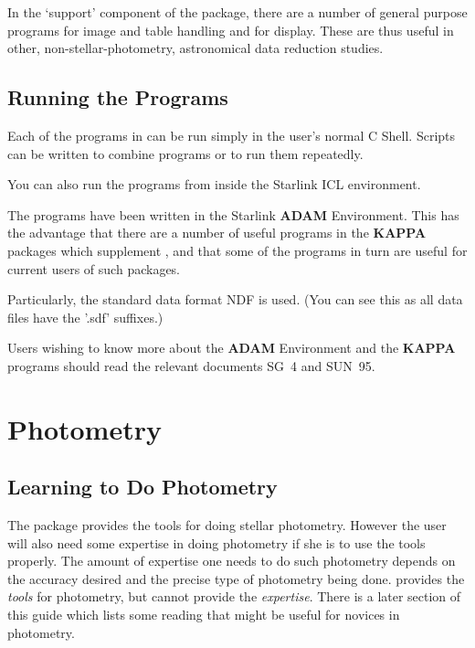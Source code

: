 In the `support' component of the \starman package, there are a number of
general purpose programs for image and table handling and for display.
These are thus useful in other, non-stellar-photometry, astronomical data
reduction studies.

\subsection{Running the Programs }

Each of the programs in \starman can be run simply in the user's
normal C Shell. Scripts can be written to combine programs or to
run them repeatedly.

You can also run the programs from inside the Starlink ICL environment.

The programs have been written in the Starlink {\bf ADAM} Environment. This
has the advantage that there are a number of useful programs in the {\bf
KAPPA} packages which supplement \starman, and that some of the \starman
programs in turn are useful for current users of such packages.

Particularly, the standard data format NDF is used. (You can see
this as all data files have the '.sdf' suffixes.)

Users wishing to know more about the {\bf ADAM} Environment and the
{\bf KAPPA} programs should read the relevant documents
SG~4 and SUN~95.













\section { Photometry}


\subsection{Learning to Do Photometry}

The \starman package provides the tools for doing stellar photometry.
However the user will also need some expertise in doing photometry if she is
to use the tools properly. The amount of expertise one needs to do such
photometry depends on the accuracy desired and the precise type of
photometry being done. \starman provides the {\it tools\/} for photometry,
but cannot provide the {\it expertise}. There is a later section of this
guide which lists some reading that might be useful for novices in
photometry.

